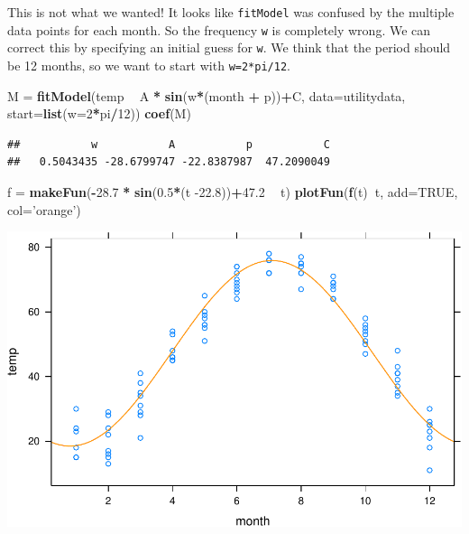 \documentclass[
]{book}
\newenvironment{Shaded}{\begin{snugshade}}{\end{snugshade}}
\newcommand{\DataTypeTok}[1]{\textcolor[rgb]{0.13,0.29,0.53}{#1}}
\newcommand{\DecValTok}[1]{\textcolor[rgb]{0.00,0.00,0.81}{#1}}
\newcommand{\FloatTok}[1]{\textcolor[rgb]{0.00,0.00,0.81}{#1}}
\newcommand{\KeywordTok}[1]{\textcolor[rgb]{0.13,0.29,0.53}{\textbf{#1}}}
\newcommand{\NormalTok}[1]{#1}
\newcommand{\OperatorTok}[1]{\textcolor[rgb]{0.81,0.36,0.00}{\textbf{#1}}}
\newcommand{\OtherTok}[1]{\textcolor[rgb]{0.56,0.35,0.01}{#1}}
\newcommand{\StringTok}[1]{\textcolor[rgb]{0.31,0.60,0.02}{#1}}
\begin{document}
This is not what we wanted! It looks like \texttt{fitModel} was confused by the multiple data points for each month. So the frequency \texttt{w} is completely wrong. We can correct this by specifying an initial guess for \texttt{w}. We think that the period should be 12 months, so we want to start with \texttt{w=2*pi/12}.

\begin{Shaded}
\begin{Highlighting}[]
\NormalTok{M =}\StringTok{ }\KeywordTok{fitModel}\NormalTok{(temp }\OperatorTok{~}\StringTok{ }\NormalTok{A }\OperatorTok{*}\StringTok{ }\KeywordTok{sin}\NormalTok{(w}\OperatorTok{*}\NormalTok{(month }\OperatorTok{+}\StringTok{ }\NormalTok{p))}\OperatorTok{+}\NormalTok{C, }\DataTypeTok{data=}\NormalTok{utilitydata, }\DataTypeTok{start=}\KeywordTok{list}\NormalTok{(}\DataTypeTok{w=}\DecValTok{2}\OperatorTok{*}\NormalTok{pi}\OperatorTok{/}\DecValTok{12}\NormalTok{))}
\KeywordTok{coef}\NormalTok{(M)}
\end{Highlighting}
\end{Shaded}

\begin{verbatim}
##           w           A           p           C 
##   0.5043435 -28.6799747 -22.8387987  47.2090049
\end{verbatim}

\begin{Shaded}
\begin{Highlighting}[]
\NormalTok{f =}\StringTok{ }\KeywordTok{makeFun}\NormalTok{(}\OperatorTok{-}\FloatTok{28.7} \OperatorTok{*}\StringTok{ }\KeywordTok{sin}\NormalTok{(}\FloatTok{0.5}\OperatorTok{*}\NormalTok{(t }\FloatTok{-22.8}\NormalTok{))}\OperatorTok{+}\FloatTok{47.2} \OperatorTok{~}\StringTok{ }\NormalTok{t)}
\KeywordTok{plotFun}\NormalTok{(}\KeywordTok{f}\NormalTok{(t)}\OperatorTok{~}\NormalTok{t, }\DataTypeTok{add=}\OtherTok{TRUE}\NormalTok{, }\DataTypeTok{col=}\StringTok{'orange'}\NormalTok{)}
\end{Highlighting}
\end{Shaded}

\includegraphics{_bookdown_files/math135_handbook_files/figure-latex/unnamed-chunk-42-1.pdf}
\end{document}

